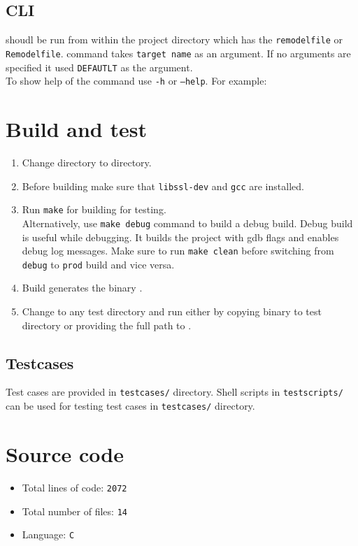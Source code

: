 \documentclass[12pt,letterpaper,titlepage, one-sided]{article}
\begin{document}
	\subsection{CLI}
	\remodel shoudl be run from within the project directory which has the \texttt{remodelfile} or \texttt{Remodelfile}. 
	\remodel command takes \texttt{target name} as an argument. If no arguments are specified it used \texttt{DEFAUTLT} as the argument.
	\\
	To show help of the command use \texttt{-h} or \texttt{--help}. For example:\\


\section{Build and test \remodel}
	\begin{enumerate}
	\item
	Change directory to \remodel directory.
	\item
	Before building \remodel make sure that \texttt{libssl-dev} and \texttt{gcc} are installed.
	\item
	Run \texttt{make} for building \remodel for testing. \\Alternatively, use \texttt{make debug} command to build a debug build. Debug build is useful while debugging. It builds the project with gdb flags and enables debug log messages. Make sure to run \texttt{make clean} before switching from \texttt{debug} to \texttt{prod} build and vice versa.
	\item
	Build generates the binary \remodel. 
	\item
	Change to any test directory and run \remodel either by copying \remodel binary to test directory or providing the full path to \remodel.
	\end{enumerate}
\subsection{Testcases}
	Test cases are provided in \texttt{testcases/} directory. Shell scripts in \texttt{testscripts/} can be used for testing test cases in \texttt{testcases/} directory.
\section{Source code}
	\begin{itemize}
	\item
	Total lines of code: \texttt{2072}
	\item
	Total number of files: \texttt{14}
	\item
	Language: \texttt{C}
	\end{itemize}
\end{document}

